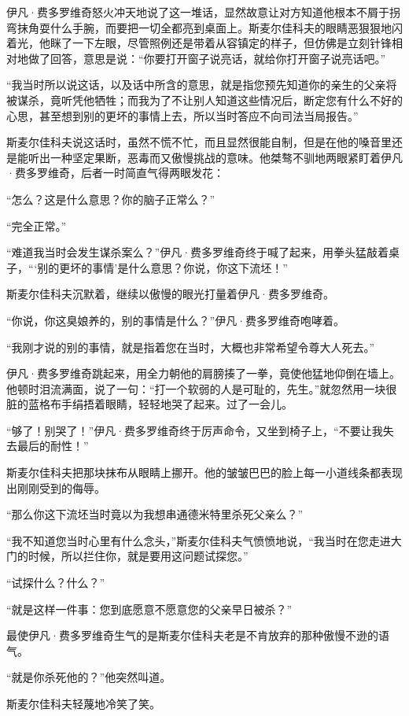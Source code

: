 \par 伊凡·费多罗维奇怒火冲天地说了这一堆话，显然故意让对方知道他根本不屑于拐弯抹角耍什么手腕，而要把一切全都亮到桌面上。斯麦尔佳科夫的眼睛恶狠狠地闪着光，他眯了一下左眼，尽管照例还是带着从容镇定的样子，但仿佛是立刻针锋相对地做了回答，意思是说：“你要打开窗子说亮话，就给你打开窗子说亮话吧。”
\par “我当时所以说这话，以及话中所含的意思，就是指您预先知道你的亲生的父亲将被谋杀，竟听凭他牺牲；而我为了不让别人知道这些情况后，断定您有什么不好的心思，甚至想到别的更坏的事情上去，所以当时答应不向司法当局报告。”
\par 斯麦尔佳科夫说这话时，虽然不慌不忙，而且显然很能自制，但是在他的嗓音里还是能听出一种坚定果断，恶毒而又傲慢挑战的意味。他桀骜不驯地两眼紧盯着伊凡·费多罗维奇，后者一时简直气得两眼发花：
\par “怎么？这是什么意思？你的脑子正常么？”
\par “完全正常。”
\par “难道我当时会发生谋杀案么？”伊凡·费多罗维奇终于喊了起来，用拳头猛敲着桌子，“‘别的更坏的事情’是什么意思？你说，你这下流坯！”
\par 斯麦尔佳科夫沉默着，继续以傲慢的眼光打量着伊凡·费多罗维奇。
\par “你说，你这臭娘养的，别的事情是什么？”伊凡·费多罗维奇咆哮着。
\par “我刚才说的别的事情，就是指着您在当时，大概也非常希望令尊大人死去。”
\par 伊凡·费多罗维奇跳起来，用全力朝他的肩膀揍了一拳，竟使他猛地仰倒在墙上。他顿时泪流满面，说了一句：“打一个软弱的人是可耻的，先生。”就忽然用一块很脏的蓝格布手绢捂着眼睛，轻轻地哭了起来。过了一会儿。
\par “够了！别哭了！”伊凡·费多罗维奇终于厉声命令，又坐到椅子上，“不要让我失去最后的耐性！”
\par 斯麦尔佳科夫把那块抹布从眼睛上挪开。他的皱皱巴巴的脸上每一小道线条都表现出刚刚受到的侮辱。
\par “那么你这下流坯当时竟以为我想串通德米特里杀死父亲么？”
\par “我不知道您当时心里有什么念头，”斯麦尔佳科夫气愤愤地说，“我当时在您走进大门的时候，所以拦住你，就是要用这问题试探您。”
\par “试探什么？什么？”
\par “就是这样一件事：您到底愿意不愿意您的父亲早日被杀？”
\par 最使伊凡·费多罗维奇生气的是斯麦尔佳科夫老是不肯放弃的那种傲慢不逊的语气。
\par “就是你杀死他的？”他突然叫道。
\par 斯麦尔佳科夫轻蔑地冷笑了笑。
